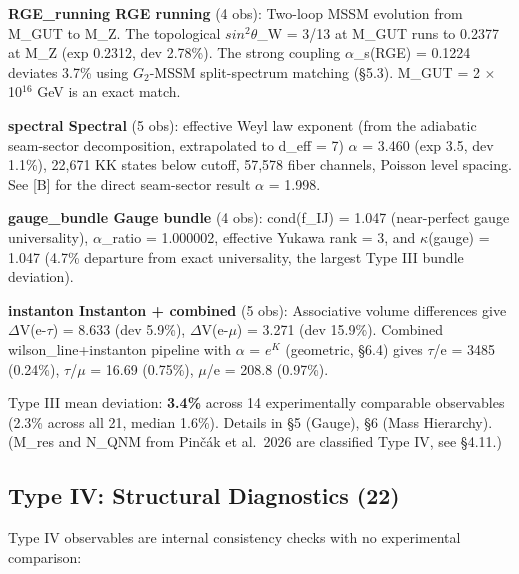 \documentclass[11pt,a4paper]{article}
\begin{document}
\textbf{RGE\_running RGE running} (4 obs): Two-loop MSSM evolution from
M\_GUT to M\_Z. The topological \(sin^{2} \theta\)\_W = 3/13 at M\_GUT
runs to 0.2377 at M\_Z (exp 0.2312, dev 2.78\%). The strong coupling
\(\alpha\)\_s(RGE) = 0.1224 deviates 3.7\% using \(G_{2}\)-MSSM
split-spectrum matching (§5.3). M\_GUT = 2 \(\times\) 10\(^{16}\) GeV is
an exact match.

\textbf{spectral Spectral} (5 obs): effective Weyl law exponent (from
the adiabatic seam-sector decomposition, extrapolated to d\_eff = 7)
\(\alpha\) = 3.460 (exp 3.5, dev 1.1\%), 22,671 KK states below cutoff,
57,578 fiber channels, Poisson level spacing. See [B] for
the direct seam-sector result \(\alpha\) = 1.998.

\textbf{gauge\_bundle Gauge bundle} (4 obs): cond(f\_IJ) = 1.047
(near-perfect gauge universality), \(\alpha\)\_ratio = 1.000002,
effective Yukawa rank = 3, and \(\kappa\)(gauge) = 1.047 (4.7\%
departure from exact universality, the largest Type III bundle
deviation).

\textbf{instanton Instanton + combined} (5 obs): Associative volume
differences give \(\Delta\)V(e-\(\tau\)) = 8.633 (dev 5.9\%),
\(\Delta\)V(e-\(\mu\)) = 3.271 (dev 15.9\%). Combined
wilson\_line+instanton pipeline with \(\alpha\) = \(e^K\) (geometric,
§6.4) gives \(\tau\)/e = 3485 (0.24\%), \(\tau\)/\(\mu\) = 16.69
(0.75\%), \(\mu\)/e = 208.8 (0.97\%).

Type III mean deviation: \textbf{3.4\%} across 14 experimentally
comparable observables (2.3\% across all 21, median 1.6\%). Details in
§5 (Gauge), §6 (Mass Hierarchy). (M\_res and N\_QNM from Pinčák et
al.~2026 \cite{42} are classified Type IV, see §4.11.)

\subsection{Type IV: Structural Diagnostics (22)}

Type IV observables are internal consistency checks with no experimental
comparison:
\end{document}
